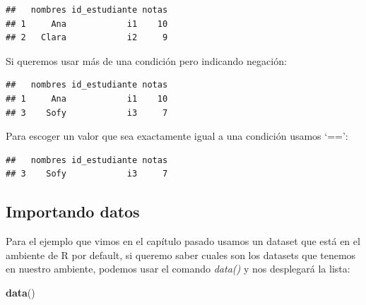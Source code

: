 \documentclass[
]{book}
\newenvironment{Shaded}{\begin{snugshade}}{\end{snugshade}}
\newcommand{\DecValTok}[1]{\textcolor[rgb]{0.00,0.00,0.81}{#1}}
\newcommand{\FunctionTok}[1]{\textcolor[rgb]{0.13,0.29,0.53}{\textbf{#1}}}
\newcommand{\NormalTok}[1]{#1}
\newcommand{\SpecialCharTok}[1]{\textcolor[rgb]{0.81,0.36,0.00}{\textbf{#1}}}
\newcommand{\StringTok}[1]{\textcolor[rgb]{0.31,0.60,0.02}{#1}}
\begin{document}
\begin{verbatim}
##   nombres id_estudiante notas
## 1     Ana            i1    10
## 2   Clara            i2     9
\end{verbatim}

Si queremos usar más de una condición pero indicando negación:

\begin{Shaded}
\end{Shaded}

\begin{verbatim}
##   nombres id_estudiante notas
## 1     Ana            i1    10
## 3    Sofy            i3     7
\end{verbatim}

Para escoger un valor que sea exactamente igual a una condición usamos `==':

\begin{Shaded}
\end{Shaded}

\begin{verbatim}
##   nombres id_estudiante notas
## 3    Sofy            i3     7
\end{verbatim}

\subsection{Importando datos}\label{importing-data}

Para el ejemplo que vimos en el capítulo pasado usamos un dataset que está en el ambiente de R por default, si queremo saber cuales son los datasets que tenemos en nuestro ambiente, podemos usar el comando \emph{data()} y nos desplegará la lista:

\begin{Shaded}
\begin{Highlighting}[]
\FunctionTok{data}\NormalTok{()}
\end{Highlighting}
\end{Shaded}
\end{document}
